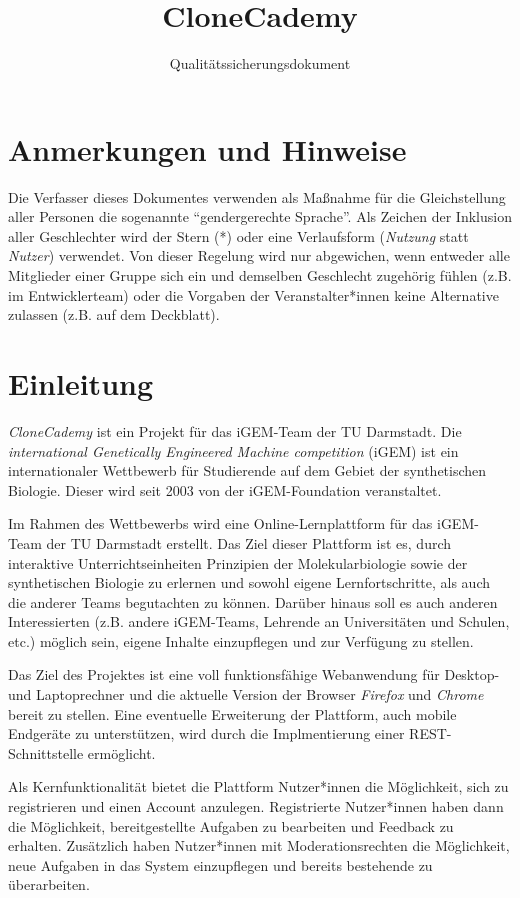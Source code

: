 \documentclass[accentcolor=tud0b,12pt,paper=a4]{tudreport}
\title{CloneCademy}
\subtitle{Qualitätssicherungsdokument}
\begin{document}
\maketitle
\tableofcontents

\chapter*{Anmerkungen und Hinweise}
Die Verfasser dieses Dokumentes verwenden als Maßnahme für die Gleichstellung aller Personen die sogenannte "`gendergerechte Sprache"'. Als Zeichen der Inklusion aller Geschlechter wird der Stern (*) oder eine Verlaufsform (\emph{Nutzung} statt \emph{Nutzer}) verwendet. Von dieser Regelung wird nur abgewichen, wenn entweder alle Mitglieder einer Gruppe sich ein und demselben Geschlecht zugehörig fühlen (z.B. im Entwicklerteam) oder die Vorgaben der Veranstalter*innen keine Alternative zulassen (z.B. auf dem Deckblatt).

\chapter{Einleitung}

\emph{CloneCademy} ist ein Projekt für das iGEM-Team der TU Darmstadt. Die \emph{international Genetically Engineered Machine competition} (iGEM) ist ein internationaler Wettbewerb für Studierende auf dem Gebiet der synthetischen Biologie.
Dieser wird seit 2003 von der iGEM-Foundation veranstaltet.

Im Rahmen des Wettbewerbs wird eine Online-Lernplattform für das iGEM-Team der TU Darmstadt erstellt. Das Ziel dieser Plattform ist es, durch interaktive Unterrichtseinheiten Prinzipien der Molekularbiologie sowie der synthetischen Biologie zu erlernen und sowohl eigene Lernfortschritte, als auch die anderer Teams begutachten zu können. Darüber hinaus soll es auch anderen Interessierten (z.B. andere iGEM-Teams, Lehrende an Universitäten und Schulen, etc.) möglich sein, eigene Inhalte einzupflegen und zur Verfügung zu stellen.

Das Ziel des Projektes ist eine voll funktionsfähige Webanwendung für Desktop- und Laptoprechner und die aktuelle Version der Browser \emph{Firefox} und \emph{Chrome} bereit zu stellen. Eine eventuelle Erweiterung der Plattform, auch mobile Endgeräte zu unterstützen, wird durch die Implmentierung einer REST-Schnittstelle ermöglicht.

Als Kernfunktionalität bietet die Plattform Nutzer*innen die Möglichkeit, sich zu registrieren und einen Account anzulegen. Registrierte Nutzer*innen haben dann die Möglichkeit, bereitgestellte Aufgaben zu bearbeiten und Feedback zu erhalten. Zusätzlich haben Nutzer*innen mit Moderationsrechten die Möglichkeit, neue Aufgaben in das System einzupflegen und bereits bestehende zu überarbeiten.
\end{document}
